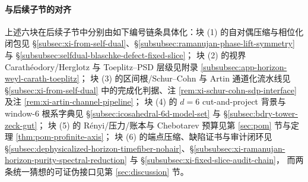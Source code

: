 \paragraph{与后续子节的对齐}
上述六块在后续子节中分别由如下编号链条具体化：块 (1) 的自对偶压缩与相位化闭包见 \S\ref{subsec:xi-from-self-dual}、\S\ref{subsubsec:ramanujan-phase-lift-symmetry} 与 \S\ref{subsubsec:selfdual-blaschke-defect-fixed-slice}；
块 (2) 的视界 Carath\'eodory/Herglotz 与 Toeplitz--PSD 层级见附录 \ref{subsubsec:app-horizon-weyl-carath-toeplitz}；
块 (3) 的区间根/Schur--Cohn 与 Artin 通道化流水线见 \S\ref{subsec:xi-from-self-dual} 中的完成化判据、注 \ref{rem:xi-schur-cohn-sdp-interface} 及注 \ref{rem:xi-artin-channel-pipeline}；
块 (4) 的 \(d=6\) cut-and-project 背景与 window-6 根系字典见 \S\ref{subsec:icosahedral-6d-model-set} 与 \S\ref{subsec:bdry-tower-zeck-gut}；
块 (5) 的 Rényi/压力/账本与 Chebotarev 预算见第 \ref{sec:pom} 节与定理 \ref{thm:pom-profinite-axis}；
块 (6) 的端点压缩、缺陷证书与审计闭环见 \S\ref{subsec:dephysicalized-horizon-timefiber-nohair}、\S\ref{subsubsec:xi-ramanujan-horizon-purity-spectral-reduction} 与 \S\ref{subsubsec:xi-fixed-slice-audit-chain}，
而两条统一猜想的可证伪接口见第 \ref{sec:discussion} 节。


